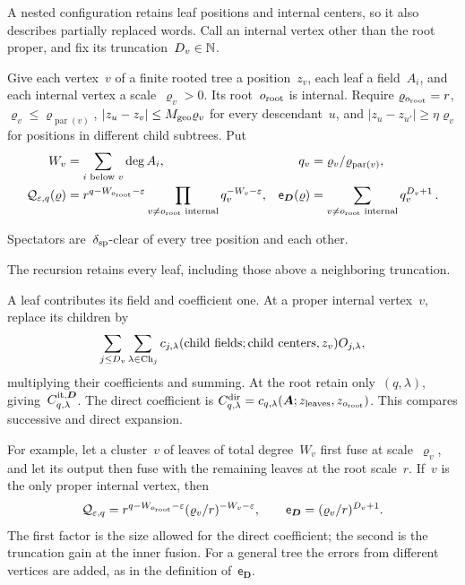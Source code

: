 A nested configuration retains leaf positions and internal centers, so it also describes partially replaced words. Call an internal vertex other than the root proper, and fix its truncation~$D_v\in\mathbb{N}$.

\begin{samepage}
\begin{definition}\label{def:D34}
Give each vertex~$v$ of a finite rooted tree a position~$z_v$, each leaf a field~$A_i$, and each internal vertex a scale~$\varrho_v>0$. Its root~$o_{\rm root}$ is internal. Require $\varrho_{o_{\rm root}}=r$, $\varrho_v\le\varrho_{\operatorname{par}(v)}$, $|z_u-z_v|\le M_{\rm geo}\varrho_v$ for every descendant~$u$, and $|z_u-z_{u'}|\ge\eta\varrho_v$ for positions in different child subtrees. Put
\begin{align*}
W_v&=\sum_{i\text{ below }v}\deg A_i,&q_v&=\varrho_v/\varrho_{\operatorname{par}(v)},\\
\mathcal Q_{\varepsilon,q}(\varrho)&=r^{q-W_{o_{\rm root}}-\varepsilon}
\prod_{v\ne o_{\rm root}\text{ internal}}q_v^{-W_v-\varepsilon},&
\mathsf e_{\boldsymbol D}(\varrho)&=\sum_{v\ne o_{\rm root}\text{ internal}}q_v^{D_v+1}\,.
\end{align*}
\end{definition}
\end{samepage}
Spectators are~$\delta_{\rm sp}$-clear of every tree position and each other.

The recursion retains every leaf, including those above a neighboring truncation.

\begin{samepage}
\begin{definition}\label{def:D35}
A leaf contributes its field and coefficient one. At a proper internal vertex~$v$, replace its children by
\begin{equation*}
\sum_{j\le D_v}\sum_{\lambda\in\mathrm{Ch}_{j}}
 c_{j,\lambda}(\text{child fields};\text{child centers},z_v)O_{j,\lambda},
\end{equation*}
multiplying their coefficients and summing. At the root retain only~$(q,\lambda)$, giving~$C^{\rm it,\boldsymbol D}_{q,\lambda}$. The direct coefficient is $C^{\rm dir}_{q,\lambda}=c_{q,\lambda}(\boldsymbol A;z_{\rm leaves},z_{o_{\rm root}})$. This compares successive and direct expansion.
\end{definition}
\end{samepage}

For example, let a cluster~$v$ of leaves of total degree~$W_v$ first fuse at scale~$\varrho_v$, and let its output then fuse with the remaining leaves at the root scale~$r$. If~$v$ is the only proper internal vertex, then
\begin{equation*}
\mathcal Q_{\varepsilon,q}=r^{q-W_{o_{\rm root}}-\varepsilon}(\varrho_v/r)^{-W_v-\varepsilon},
\qquad \mathsf e_{\boldsymbol D}=(\varrho_v/r)^{D_v+1}.
\end{equation*}
The first factor is the size allowed for the direct coefficient; the second is the truncation gain at the inner fusion. For a general tree the errors from different vertices are added, as in the definition of~$\mathsf e_{\boldsymbol D}$.


